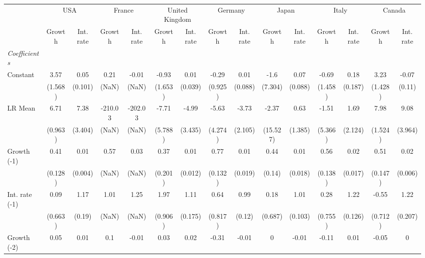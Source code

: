 \begin{table}[htbp] 
	\centering
	 \scriptsize
	\begin{tabular}{@{\extracolsep{4pt}}lcccccccccccccc@{}}		\hline\hline
		 		 & \multicolumn{2}{c}{USA} &\multicolumn{2}{c}{France} &\multicolumn{2}{c}{United Kingdom} &\multicolumn{2}{c}{Germany} &\multicolumn{2}{c}{Japan} &\multicolumn{2}{c}{Italy} &\multicolumn{2}{c}{Canada} \\ 
 		 & Growth 	 & Int. rate 	 & Growth 	 & Int. rate 	 & Growth 	 & Int. rate 	 & Growth 	 & Int. rate 	 & Growth 	 & Int. rate 	 & Growth 	 & Int. rate 	 & Growth 	 & Int. rate\\\cline{2-3}\cline{4-5}\cline{6-7}\cline{8-9}\cline{10-11}\cline{12-13}\cline{14-15}
\rule{0pt}{4ex} 
 \emph{Coefficients} 	  		 & 		 & 		 & 		 & 		 & 		 & 		 & 		 & 		 & 		 & 		 & 		 & 		 & 		 &\\ 
\quad Constant 	 & 3.57 	 & 0.05 	 & 0.21 	 & -0.01 	 & -0.93 	 & 0.01 	 & -0.29 	 & 0.01 	 & -1.6 	 & 0.07 	 & -0.69 	 & 0.18 	 & 3.23 	 & -0.07	 \\ 
 		 & (1.568) 	 & (0.101) 	 & (NaN) 	 & (NaN) 	 & (1.653) 	 & (0.039) 	 & (0.925) 	 & (0.088) 	 & (7.304) 	 & (0.088) 	 & (1.458) 	 & (0.187) 	 & (1.428) 	 & (0.11) 	 \\ 
\quad LR Mean 	 & 6.71 	 & 7.38 	 & -210.03 	 & -202.03 	 & -7.71 	 & -4.99 	 & -5.63 	 & -3.73 	 & -2.37 	 & 0.63 	 & -1.51 	 & 1.69 	 & 7.98 	 & 9.08	 \\ 
 		 & (0.963) 	 & (3.404) 	 & (NaN) 	 & (NaN) 	 & (5.788) 	 & (3.435) 	 & (4.274) 	 & (2.105) 	 & (15.527) 	 & (1.385) 	 & (5.366) 	 & (2.124) 	 & (1.524) 	 & (3.964) 	 \\ 
\quad Growth (-1) 	 &0.41 	 & 0.01 	 & 0.57 	 & 0.03 	 & 0.37 	 & 0.01 	 & 0.77 	 & 0.01 	 & 0.44 	 & 0.01 	 & 0.56 	 & 0.02 	 & 0.51 	 & 0.02	 \\ 
 		 & (0.128) 	 & (0.004) 	 & (NaN) 	 & (NaN) 	 & (0.201) 	 & (0.012) 	 & (0.132) 	 & (0.019) 	 & (0.14) 	 & (0.018) 	 & (0.138) 	 & (0.017) 	 & (0.147) 	 & (0.006) 	 \\ 
\quad Int. rate (-1) 	 &0.09 	 & 1.17 	 & 1.01 	 & 1.25 	 & 1.97 	 & 1.11 	 & 0.64 	 & 0.99 	 & 0.18 	 & 1.01 	 & 0.28 	 & 1.22 	 & -0.55 	 & 1.22	 \\ 
 		 & (0.663) 	 & (0.19) 	 & (NaN) 	 & (NaN) 	 & (0.906) 	 & (0.175) 	 & (0.817) 	 & (0.12) 	 & (0.687) 	 & (0.103) 	 & (0.755) 	 & (0.126) 	 & (0.712) 	 & (0.207) 	 \\ 
\quad Growth (-2) 	 &0.05 	 & 0.01 	 & 0.1 	 & -0.01 	 & 0.03 	 & 0.02 	 & -0.31 	 & -0.01 	 & 0 	 & -0.01 	 & -0.11 	 & 0.01 	 & -0.05 	 & 0	 \\ 

\end{tabular}
\end{table}
